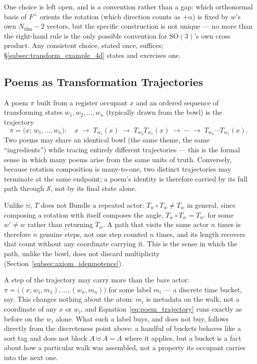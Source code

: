 \documentclass[12pt, a4paper]{article}
\begin{document}
One choice is left open, and is a convention rather than a gap:
which orthonormal basis of $F^\perp$ orients the rotation (which
direction counts as $+\alpha$) is fixed by $w$'s own
$N_{\mathrm{dim}}-2$ vectors, but the specific construction is not
unique --- no more than the right-hand rule is the only possible
convention for $\mathrm{SO}(3)$'s own cross product. Any consistent
choice, stated once, suffices; \S\ref{subsec:transform_example_4d}
states and exercises one.

\subsection{Poems as Transformation Trajectories}
\label{subsec:transform_trajectories}
A poem $\pi$ built from a register occupant $x$ and an ordered sequence of
transforming states $w_1, w_2, \ldots, w_n$ (typically drawn from the bowl) is the trajectory
\begin{equation}
    \pi = \big(x;\, w_1, \ldots, w_n\big): \quad
    x \;\longrightarrow\; T_{w_1}(x) \;\longrightarrow\; T_{w_2}T_{w_1}(x) \;\longrightarrow\; \cdots \;\longrightarrow\; T_{w_n}\cdots T_{w_1}(x).
    \label{eq:poem_trajectory}
\end{equation}
Two poems may share an identical bowl (the same theme, the
same ``ingredients'') while tracing entirely different trajectories
--- this is the formal sense in which many poems arise from the same
units of truth. Conversely, because rotation composition is
many-to-one, two distinct trajectories may terminate at the same
endpoint; a poem's identity is therefore carried by its full path
through $\mathcal{S}$, not by its final state alone.

Unlike $\uplus$, $T$ does not Bundle a repeated actor: $T_w\circ
T_w\neq T_w$ in general, since composing a rotation with itself
composes the angle, $T_w\circ T_w = T_{w'}$ for some $w'\neq w$ rather
than returning $T_w$. A path that visits the same actor $n$ times is
therefore $n$ genuine steps, not one step counted $n$ times, and its
length recovers that count without any coordinate carrying it. This is
the sense in which the path, unlike the bowl, does not discard
multiplicity (Section~\ref{subsec:axiom_idempotence}).

A step of the trajectory may carry more than the bare actor:
$\pi=\bigl((x;w_1,m_1),\allowbreak\ldots,\allowbreak(w_n,m_n)\bigr)$ for some label $m_i$ ---
a discrete time bucket, say. This changes nothing about the atom: $m_i$
is metadata on the walk, not a coordinate of any $x$ or $w_i$, and
Equation~\eqref{eq:poem_trajectory} runs exactly as before on the
$w_i$ alone. What such a label buys, and does not buy, follows
directly from the discreteness point above: a handful of buckets
behaves like a sort tag and does not block $A\uplus A=A$ where it
applies, but a bucket is a fact about how a particular walk was
assembled, not a property its occupant carries into the next one.
\end{document}

